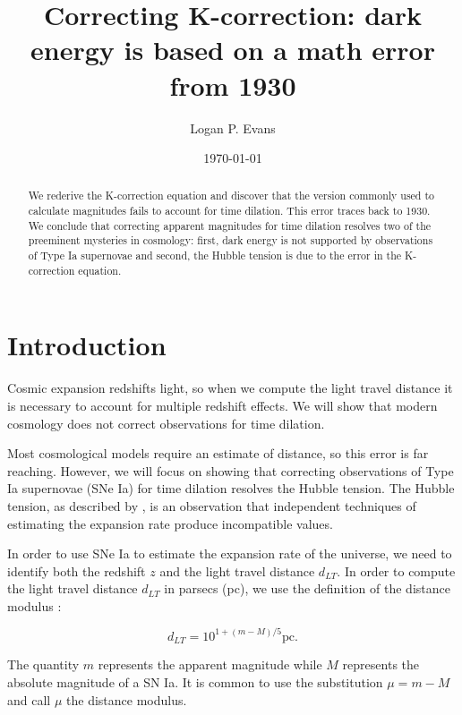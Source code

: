 \title{Correcting K-correction: dark energy is based on a math error from 1930}

\author{Logan P. Evans}
 \noaffiliation

\date{\today}

\begin{abstract}
We rederive the K-correction equation and discover that the version commonly
used to calculate magnitudes fails to account for time dilation. This error
traces back to 1930. We conclude that correcting apparent magnitudes for time
dilation resolves two of the preeminent mysteries in cosmology: first, dark
energy is not supported by observations of Type Ia supernovae and second, the
Hubble tension is due to the error in the K-correction equation.
\end{abstract}

\maketitle

\section{Introduction}

Cosmic expansion redshifts light, so when we compute the light travel distance
it is necessary to account for multiple redshift effects. We will show that
modern cosmology does not correct observations for time dilation.

Most cosmological models require an estimate of distance, so this error is far
reaching. However, we will focus on showing that correcting observations of
Type Ia supernovae (SNe Ia) for time dilation resolves the Hubble tension. The
Hubble tension, as described by \citet{verde2019}, is an observation that
independent techniques of estimating the expansion rate produce incompatible
values.

In order to use SNe Ia to estimate the expansion rate of the universe, we need
to identify both the redshift $z$ and the light travel distance $d_{LT}$. In
order to compute the light travel distance $d_{LT}$ in parsecs (pc), we use the
definition of the distance modulus \citep{weinberg2008}:

\begin{equation}
\label{eq:mu_def}
  d_{LT} = 10^{1 + (m - M)/5} \text{pc}.
\end{equation}

\noindent The quantity $m$ represents the apparent magnitude while $M$
represents the absolute magnitude of a SN Ia. It is common to use the
substitution $\mu = m - M$ and call $\mu$ the distance modulus.

